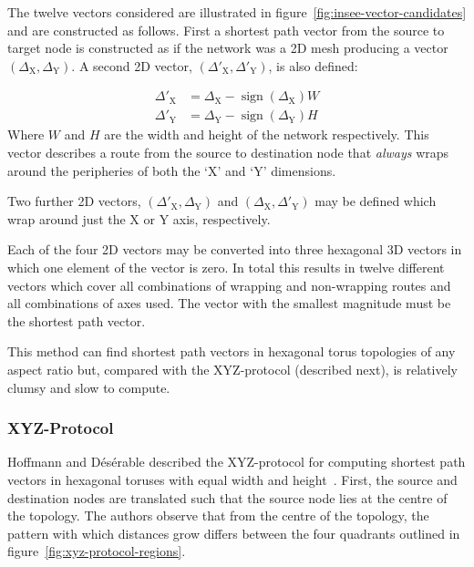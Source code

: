 				The twelve vectors considered are illustrated in
				figure~\ref{fig:insee-vector-candidates} and are constructed as
				follows.  First a shortest path vector from the source to target node
				is constructed as if the network was a 2D mesh producing a vector
				$(\Delta_\textrm{X},\Delta_\textrm{Y})$. A second 2D vector,
				$(\Delta'_\textrm{X},\Delta'_\textrm{Y})$, is also defined:
				
				\noindent
				\begin{align*}
					\Delta'_\textrm{X} &= \Delta_\textrm{X} - \operatorname{sign}(\Delta_\textrm{X})W
					\\
					\Delta'_\textrm{Y} &= \Delta_\textrm{Y} - \operatorname{sign}(\Delta_\textrm{Y})H
				\end{align*}
				Where $W$ and $H$ are the width and height of the network respectively.
				This vector describes a route from the source to destination node that
				\emph{always} wraps around the peripheries of both the `X' and `Y'
				dimensions.
				
				Two further 2D vectors, $(\Delta'_\textrm{X},\Delta_\textrm{Y})$ and
				$(\Delta_\textrm{X},\Delta'_\textrm{Y})$ may be defined which wrap around
				just the X or Y axis, respectively.
				
				Each of the four 2D vectors may be converted into three hexagonal 3D
				vectors in which one element of the vector is zero. In total this
				results in twelve different vectors which cover all combinations of
				wrapping and non-wrapping routes and all combinations of axes used. The
				vector with the smallest magnitude must be the shortest path vector.
				
				This method can find shortest path vectors in hexagonal torus
				topologies of any aspect ratio but, compared with the XYZ-protocol
				(described next), is relatively clumsy and slow to compute.
			
			\subsubsection{XYZ-Protocol}
			
				Hoffmann and D\'es\'erable described the XYZ-protocol for computing
				shortest path vectors in hexagonal toruses with equal width and
				height~\cite{hoffmann15,hoffmann11}.  First, the source and destination
				nodes are translated such that the source node lies at the centre of
				the topology. The authors observe that from the centre of the topology,
				the pattern with which distances grow differs between the four
				quadrants outlined in figure~\ref{fig:xyz-protocol-regions}.
				

